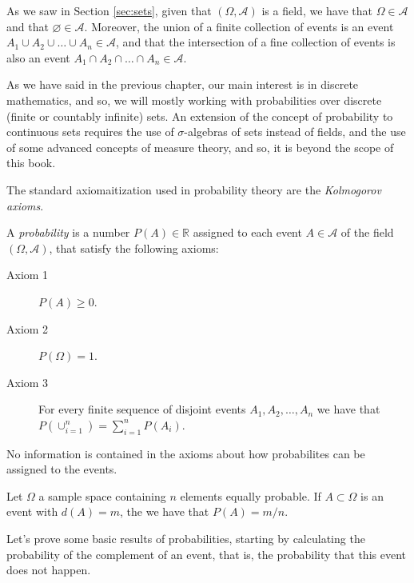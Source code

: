 As we saw in Section \ref{sec:sets}, given that $\left( \Omega, \mathcal{A} \right)$ is a field, we have that $\Omega \in \mathcal{A}$ and that $\varnothing \in \mathcal{A}$. Moreover, the union of a finite collection of events is an event $A_1 \cup A_2 \cup \ldots \cup A_n \in \mathcal{A}$, and that the intersection of a fine collection of events is also an event $A_1 \cap A_2 \cap \ldots \cap A_n \in \mathcal{A}$.

As we have said in the previous chapter, our main interest is in discrete mathematics, and so, we will mostly working with probabilities over discrete (finite or countably infinite) sets. An extension of the concept of probability to continuous sets requires the use of $\sigma$-algebras of sets instead of fields, and the use of some advanced concepts of measure theory, and so, it is beyond the scope of this book.

The standard axiomaitization used in probability theory are the \emph{Kolmogorov axioms}.

\begin{definition}
A \emph{probability} is a number $P(A) \in \mathbb{R}$ assigned to each event $A \in \mathcal{A}$ of the field $\left( \Omega, \mathcal{A} \right)$, that satisfy the following axioms:

\medskip

\begin{description}
\item [Axiom 1] $P(A) \geq 0$.
\item [Axiom 2] $P(\Omega) = 1$.
\item [Axiom 3] For every finite sequence of disjoint events $A_1, A_2, \ldots, A_n$ we have that $P(\cup_{i=1}^n) = \sum_{i=1}^n P(A_i)$.
\end{description}
\end{definition}

No information is contained in the axioms about how probabilites can be assigned to the events.

\begin{example}
Let $\Omega$ a sample space containing $n$ elements equally probable. If $A \subset \Omega$ is an event with $d(A) = m$, the we have that $P(A) = m/n$.
\end{example}

Let's prove some basic results of probabilities, starting by calculating the probability of the complement of an event, that is, the probability that this event does not happen.

